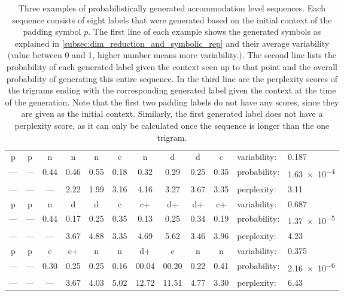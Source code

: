 \begin{table}[t]
	\centering
	\caption[Examples of probabilistically generated accommodation level sequences]
		{Three examples of probabilistically generated accommodation level sequences.
		 Each sequence consists of eight labels that were generated based on the initial context of the padding symbol $p$.
		 The first line of each example shows the generated symbols as explained in \cref{subsec:dim_reduction_and_symbolic_rep} and their average variability (value between 0 and 1, higher number means more variability.).
		 The second line lists the probability of each generated label given the context seen up to that point and the overall probability of generating this entire sequence.
		 In the third line are the perplexity scores of the trigrams ending with the corresponding generated label given the context at the time of the generation.
		 Note that the first two padding labels do not have any scores, since they are given as the initial context.
		 Similarly, the first generated label does not have a perplexity score, as it can only be calculated once the sequence is longer than the one trigram.}
	\label{tab:generated_symbol_sequences}
	\begin{tabularx}{\linewidth}{*{10}{c}l@{\hskip 0.1cm}l}
		\toprule
		p    & p    & n    & n    & n    & c    & n    & d    & d    & c    & variability: & \num{0.187}  \\
		---  & ---  & 0.44 & 0.46 & 0.55 & 0.18 & 0.32 & 0.29 & 0.25 & 0.35 & probability: & \num{1.63e-4}\\
		---  & ---  & ---  & 2.22 & 1.99 & 3.16 & 4.16 & 3.27 & 3.67 & 3.35 & perplexity: & \num{3.11}   \\[0.4cm]
		
		p    & p    & n    & d    & d    & c    & c+   & d+   & d+   & c+   & variability: & \num{0.687}  \\
		---  & ---  & 0.44 & 0.17 & 0.25 & 0.35 & 0.13 & 0.25 & 0.34 & 0.19 & probability: & \num{1.37e-5}\\
		---  & ---  & ---  & 3.67 & 4.88 & 3.35 & 4.69 & 5.62 & 3.46 & 3.96 & perplexity: & \num{4.23}   \\[0.4cm]
		
		p    & p    & c    & c+   & n    & n    & d+    & c     & n    & n    & variability: & \num{0.375}  \\
		---  & ---  & 0.30 & 0.25 & 0.25 & 0.16 & 00.04 & 00.20 & 0.22 & 0.41 & probability: & \num{2.16e-6}\\
		---  & ---  & ---  & 3.67 & 4.03 & 5.02 & 12.72 & 11.51 & 4.77 & 3.30 & perplexity: & \num{6.43}   \\
		\bottomrule
	\end{tabularx}
\end{table}

